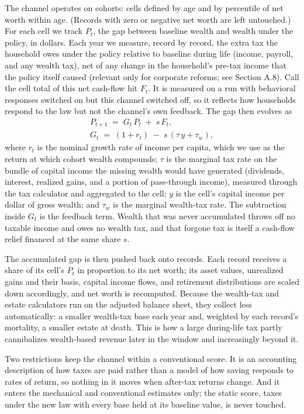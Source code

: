 \documentclass[10pt,twocolumn]{article}
\begin{document}
The channel operates on cohorts: cells defined by age and by percentile of net
worth within age. (Records with zero or negative net worth are left
untouched.) For each cell we track $P_t$, the gap between baseline wealth and
wealth under the policy, in dollars. Each year we measure, record by record,
the extra tax the household owes under the policy relative to baseline during
life (income, payroll, and any wealth tax), net of any change in the
household's pre-tax income that the policy itself caused (relevant only for
corporate reforms; see Section A.8). Call the cell total of this net cash-flow
hit $F_t$. It is measured on a run with behavioral responses switched on but
this channel switched off, so it reflects how households respond to the law
but not the channel's own feedback. The gap then evolves as
\begin{gather*}
P_{t+1} \;=\; G_t\,P_t \;+\; s\,F_t,\\
G_t \;=\; (1 + r_t) \;-\; s\,(\tau\,y + \tau_w),
\end{gather*}
where $r_t$ is the nominal growth rate of income per capita, which we use as
the return at which cohort wealth compounds; $\tau$ is the marginal tax rate
on the bundle of capital income the missing wealth would have generated
(dividends, interest, realized gains, and a portion of pass-through income),
measured through the tax calculator and aggregated to the cell; $y$ is the
cell's capital income per dollar of gross wealth; and $\tau_w$ is the marginal
wealth-tax rate. The subtraction inside $G_t$ is the feedback term. Wealth
that was never accumulated throws off no taxable income and owes no wealth
tax, and that forgone tax is itself a cash-flow relief financed at the same
share $s$.

The accumulated gap is then pushed back onto records. Each record receives a
share of its cell's $P_t$ in proportion to its net worth; its asset values,
unrealized gains and their basis, capital income flows, and retirement
distributions are scaled down accordingly, and net worth is recomputed.
Because the wealth-tax and estate calculators run on the adjusted balance
sheet, they collect less automatically: a smaller wealth-tax base each year
and, weighted by each record's mortality, a smaller estate at death. This is
how a large during-life tax partly cannibalizes wealth-based revenue later in
the window and increasingly beyond it.

Two restrictions keep the channel within a conventional score. It is an
accounting description of how taxes are paid rather than a model of how saving
responds to rates of return, so nothing in it moves when after-tax returns
change. And it enters the mechanical and conventional estimates only; the static
score, taxes under the new law with every base held at its baseline value, is
never touched.
\end{document}
